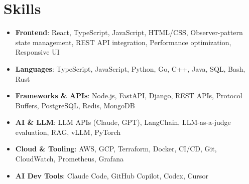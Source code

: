 \documentclass[letterpaper,11pt]{article}
\newcommand{\resumeSubHeadingListStart}{\begin{itemize}[leftmargin=0.15in, label={}]}
\newcommand{\resumeSubHeadingListEnd}{\end{itemize}}
\newcommand{\resumeSkillHeading}[2]{%
  \item\small{\textbf{#1}: #2 \vspace{-9pt}}%
}
\begin{document}
\section{Skills}
  \resumeSubHeadingListStart
    \resumeSkillHeading{Frontend}{React, TypeScript, JavaScript, HTML/CSS, Observer-pattern state management, REST API integration, Performance optimization, Responsive UI}
    \resumeSkillHeading{Languages}{TypeScript, JavaScript, Python, Go, C++, Java, SQL, Bash, Rust}
    \resumeSkillHeading{Frameworks \& APIs}{Node.js, FastAPI, Django, REST APIs, Protocol Buffers, PostgreSQL, Redis, MongoDB}
    \resumeSkillHeading{AI \& LLM}{LLM APIs (Claude, GPT), LangChain, LLM-as-a-judge evaluation, RAG, vLLM, PyTorch}
    \resumeSkillHeading{Cloud \& Tooling}{AWS, GCP, Terraform, Docker, CI/CD, Git, CloudWatch, Prometheus, Grafana}
    \resumeSkillHeading{AI Dev Tools}{Claude Code, GitHub Copilot, Codex, Cursor}
  \resumeSubHeadingListEnd
\end{document}
